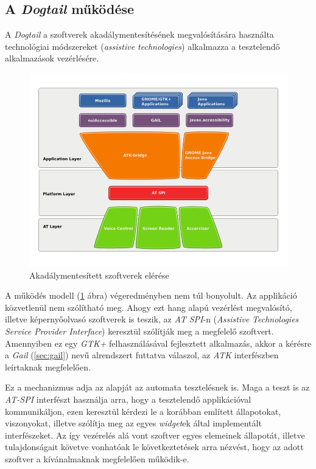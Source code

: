 \subsection{A \textit{Dogtail} működése}

A \textit{Dogtail} a szoftverek akadálymentesítésének megvalósítására használta technológiai módszereket (\textit{assistive technologies}) alkalmazza a tesztelendő alkalmazások vezérlésére.

\begin{figure}[h]
\begin{center}
\includegraphics[height=0.45\linewidth]{images/a11y.png}
\caption{Akadálymentesített szoftverek elérése\cite{gnomea11yref}}
\label{fig:a11y}
\end{center}
\end{figure}

A működés modell (\ref{fig:a11y} ábra) végeredményben nem túl bonyolult. Az applikáció közvetlenül nem szólítható meg. Ahogy ezt hang alapú vezérlést megvalósító, illetve képernyőolvasó szoftverek is teszik, az \textit{AT SPI}-n (\textit{Assistive Technologies Service Provider Interface}) keresztül szólítják meg a megfelelő szoftvert. Amennyiben ez egy \textit{GTK+} felhasználásával fejlesztett alkalmazás, akkor a kérésre a \textit{Gail} (\ref{sec:gail}) nevű alrendszert futtatva válaszol, az \textit{ATK} interfészben leírtaknak megfelelően. 

Ez a mechanizmus adja az alapját az automata tesztelésnek is. Maga a teszt is az \textit{AT-SPI} interfészt használja arra, hogy a tesztelendő applikációval kommunikáljon, ezen keresztül kérdezi le a korábban említett állapotokat, viszonyokat, illetve szólítja meg az egyes \textit{widget}ek által implementált interfészeket. Az így vezérelés alá vont szoftver egyes elemeinek állapotát, illetve tulajdonságait követve vonhatóak le következtetések arra nézvést, hogy az adott szoftver a kívánalmaknak megfelelően működik-e.
